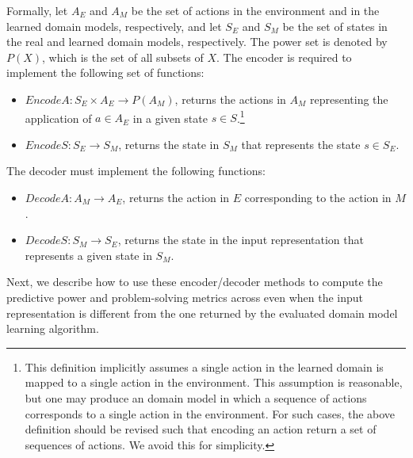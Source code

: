 \documentclass{article}
\theoremstyle{definition}
\theoremstyle{remark}
\newcommand{\encodea}{\textit{EncodeA}\xspace}
\newcommand{\encodes}{\textit{EncodeS}\xspace}
\newcommand{\decodea}{\textit{DecodeA}\xspace}
\newcommand{\decodes}{\textit{DecodeS}\xspace}
\newif\ifaddcomments
\newcommand{\roni}[1]{\ifaddcomments{\textcolor{red}{[Roni: #1]}}\fi}
\newcommand{\yarin}[1]{\ifaddcomments{\textcolor{teal}{[Yarin: #1]}}\fi}
\newcommand{\cm}[1]{\ifaddcomments{\textcolor{olive}{[Christian: #1]}}\fi}
\begin{document}
Formally, let $A_E$ and $A_M$ be the set of actions in the environment and in the learned domain models, respectively, and let $S_E$ and $S_M$ be the set of states in the real and learned domain models, respectively. The power set is denoted by $P(X)$, which is the set of all subsets of $X$. 
The encoder is required to implement the following set of functions:
\begin{itemize}
    \item $\encodea: S_E\times A_E\rightarrow P(A_M)$, returns the actions in $A_M$ representing the application of $a\in A_E$ in a given state $s \in S$.\footnote{This definition implicitly assumes a single action in the learned domain is mapped to a single action in the environment. This assumption is reasonable, but one may produce an domain model in which a sequence of actions corresponds to a single action in the environment. For such cases, the above definition should be revised such that encoding an action return a set of sequences of actions. We avoid this for simplicity.\roni{Incorporating a great comment by Christian. Is it clear?} \cm{Yep, reads good to me!}} 
    \item ${\encodes: S_E\rightarrow S_M}$, returns the state in $S_M$ that represents the state $s\in S_E$. 
\end{itemize}
The decoder must implement the following functions:
\begin{itemize}
    \item ${\decodea: A_M\rightarrow A_E}$, returns the action in $E$ corresponding to the action in $M$. 
    \item ${\decodes: S_M\rightarrow S_E}$, returns the state in the input representation that represents a given state in $S_M$. 
\end{itemize}
Next, we describe how to use these encoder/decoder methods to compute the predictive power and problem-solving metrics across even when the input representation is different from the one returned by the evaluated domain model learning algorithm.




    
    
\end{document}
